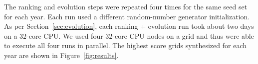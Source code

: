 The ranking and evolution steps were repeated four times for the same seed set for each year. Each run used a different random-number generator initialization. As per Section~\ref{sec:evolution}, each ranking + evolution run took about two days on a $32$-core CPU. We used four $32$-core CPU nodes on a grid and thus were able to execute all four runs in parallel. The highest score grids synthesized for each year are shown in Figure~\ref{fig:results}. 




